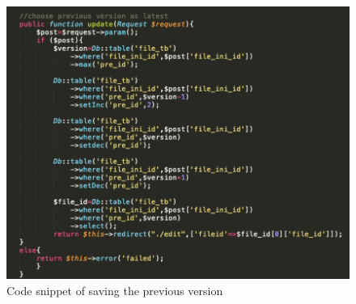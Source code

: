\begin{figure}[H]
  \centering
  \includegraphics[width=.8\textwidth]{conflictsolve.png}%
  \caption{Code snippet of saving the previous version} %
  \label{png10} %
\end{figure}

